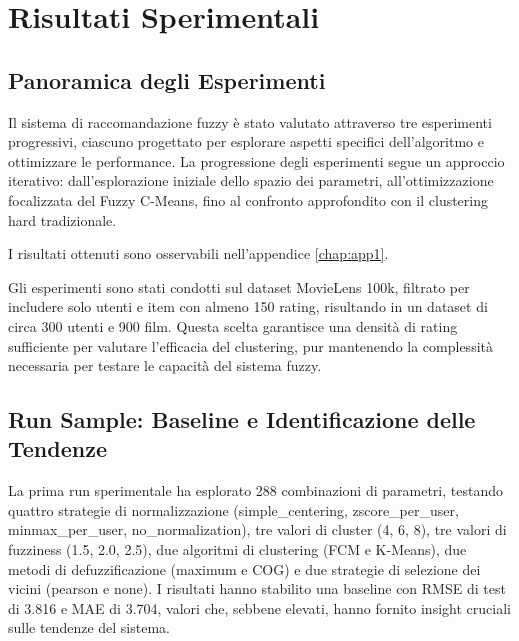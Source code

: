 \chapter{Risultati Sperimentali}
\label{chap:chap4}

\section{Panoramica degli Esperimenti}

Il sistema di raccomandazione fuzzy è stato valutato attraverso tre esperimenti progressivi, ciascuno progettato per esplorare aspetti specifici dell'algoritmo e ottimizzare le performance. La progressione degli esperimenti segue un approccio iterativo: dall'esplorazione iniziale dello spazio dei parametri, all'ottimizzazione focalizzata del Fuzzy C-Means, fino al confronto approfondito con il clustering hard tradizionale.

I risultati ottenuti sono osservabili nell'appendice \ref{chap:app1}.

Gli esperimenti sono stati condotti sul dataset MovieLens 100k, filtrato per includere solo utenti e item con almeno 150 rating, risultando in un dataset di circa 300 utenti e 900 film. Questa scelta garantisce una densità di rating sufficiente per valutare l'efficacia del clustering, pur mantenendo la complessità necessaria per testare le capacità del sistema fuzzy.

\section{Run Sample: Baseline e Identificazione delle Tendenze}

La prima run sperimentale ha esplorato 288 combinazioni di parametri, testando quattro strategie di normalizzazione (simple\_centering, zscore\_per\_user, minmax\_per\_user, no\_normalization), tre valori di cluster (4, 6, 8), tre valori di fuzziness (1.5, 2.0, 2.5), due algoritmi di clustering (FCM e K-Means), due metodi di defuzzificazione (maximum e COG) e due strategie di selezione dei vicini (pearson e none). I risultati hanno stabilito una baseline con RMSE di test di 3.816 e MAE di 3.704, valori che, sebbene elevati, hanno fornito insight cruciali sulle tendenze del sistema.

